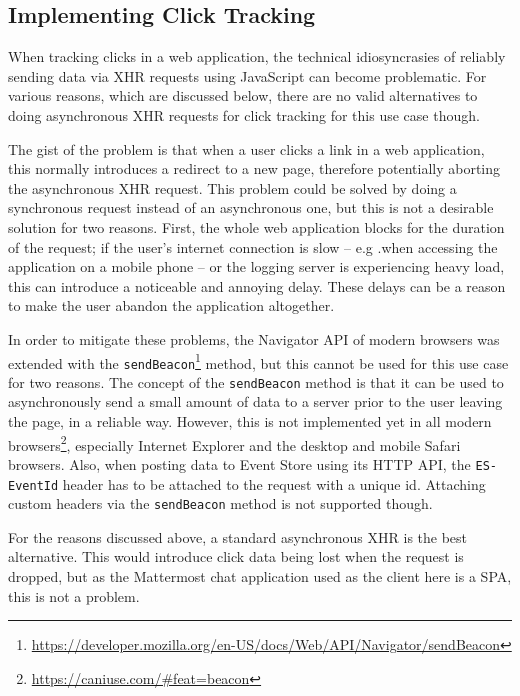 \subsection{Implementing Click Tracking}
\label{subsec:implementation:client:problems}

When tracking clicks in a web application, the technical idiosyncrasies of reliably sending data via \ac{XHR} requests using JavaScript can become problematic.
For various reasons, which are discussed below, there are no valid alternatives to doing asynchronous \ac{XHR} requests for click tracking for this use case though.

The gist of the problem is that when a user clicks a link in a web application, this normally introduces a redirect to a new page, therefore potentially aborting the asynchronous \ac{XHR} request\cite{Kohavi2010}.
This problem could be solved by doing a synchronous request instead of an asynchronous one, but this is not a desirable solution for two reasons.
First, the whole web application blocks for the duration of the request; if the user's internet connection is slow -- e.g .when accessing the application on a mobile phone -- or the logging server is experiencing heavy load, this can introduce a noticeable and annoying delay.
These delays can be a reason to make the user abandon the application altogether\cite{Kohavi2010,Dmitriev2017}.

In order to mitigate these problems, the Navigator \ac{API} of modern browsers was extended with the \texttt{sendBeacon}\footnote{\url{https://developer.mozilla.org/en-US/docs/Web/API/Navigator/sendBeacon}} method, but this cannot be used for this use case for two reasons.
The concept of the \texttt{sendBeacon} method is that it can be used to asynchronously send a small amount of data to a server prior to the user leaving the page, in a reliable way.
However, this is not implemented yet in all modern browsers\footnote{\url{https://caniuse.com/\#feat=beacon}}, especially Internet Explorer and the desktop and mobile Safari browsers.
Also, when posting data to Event Store using its \ac{HTTP} \ac{API}, the \texttt{ES-EventId} header has to be attached to the request with a unique id.
Attaching custom headers via the \texttt{sendBeacon} method is not supported though.

For the reasons discussed above, a standard asynchronous \ac{XHR} is the best alternative.
This would introduce click data being lost when the request is dropped, but as the Mattermost chat application used as the client here is a \ac{SPA}, this is not a problem.

